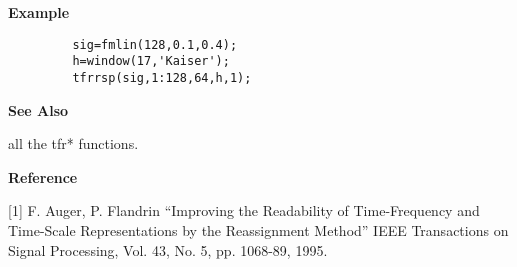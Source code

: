 
{\bf \large {}\selectfont Example}
\begin{verbatim}
         sig=fmlin(128,0.1,0.4); 
         h=window(17,'Kaiser'); 
         tfrrsp(sig,1:128,64,h,1);
\end{verbatim}
\vspace*{.5cm}

{\bf \large {}\selectfont See Also}\\
\hspace*{1.5cm}
\begin{minipage}[t]{13.5cm}
all the {\ty tfr*} functions.
\end{minipage}
\vspace*{.5cm}


{\bf \large {}\selectfont Reference}\\
\hspace*{1.5cm}
\begin{minipage}[t]{13.5cm}
[1] F. Auger, P. Flandrin ``Improving the Readability of Time-Frequency and
Time-Scale Representations by the Reassignment Method'' IEEE Transactions
on Signal Processing, Vol. 43, No. 5, pp. 1068-89, 1995.
\end{minipage}

